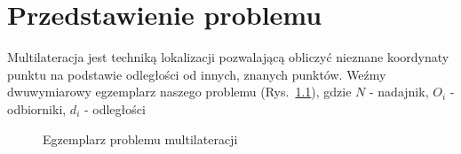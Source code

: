 \chapter{Przedstawienie problemu}\label{chap:problem}

Multilateracja jest techniką lokalizacji pozwalającą obliczyć nieznane koordynaty punktu na podstawie odległości od innych, znanych punktów. Weźmy dwuwymiarowy egzemplarz naszego problemu (Rys.~\ref{fig:example}), gdzie $N$ - nadajnik, $O_i$ - odbiorniki, $d_i$ - odległości

\begin{figure}[!h]
    \centering
    \caption{Egzemplarz problemu multilateracji}
\label{fig:example}
\end{figure}

